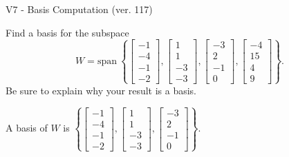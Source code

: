 \begin{exercise}
  \begin{exerciseTitle}V7 - Basis Computation (ver. 117)\end{exerciseTitle}
  \begin{exerciseStatement}
    Find a basis for the subspace 
\[W=\mathrm{span}\ \left\{\left[\begin{array}{r}
-1 \\
-4 \\
-1 \\
-2
\end{array}\right] , \left[\begin{array}{r}
1 \\
1 \\
-3 \\
-3
\end{array}\right] , \left[\begin{array}{r}
-3 \\
2 \\
-1 \\
0
\end{array}\right] , \left[\begin{array}{r}
-4 \\
15 \\
4 \\
9
\end{array}\right]\right\}.\]
 Be sure to explain why your result is a basis.


  \end{exerciseStatement}
  \begin{exerciseAnswer}
   A basis of \(W\) is  \(\left\{\left[\begin{array}{r}
-1 \\
-4 \\
-1 \\
-2
\end{array}\right] , \left[\begin{array}{r}
1 \\
1 \\
-3 \\
-3
\end{array}\right] , \left[\begin{array}{r}
-3 \\
2 \\
-1 \\
0
\end{array}\right]\right\}\).
  


  \end{exerciseAnswer}
\end{exercise}